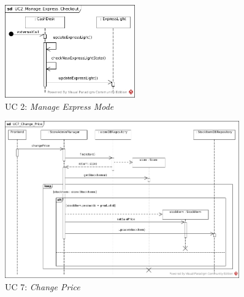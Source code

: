 			\begin{figure}[!h]
				\centering
				\includegraphics[width = 0.5\textwidth]{img/UC2_Manage_Express_Checkout.jpg}
				\caption{UC 2: \textit{Manage Express Mode}}
				\label{MS_UC2}
			\end{figure}
			
			\begin{figure}[!h]
				\centering
				\includegraphics[width = 0.9\textwidth]{img/UC7_Change_Price.jpg}
				\caption{UC 7: \textit{Change Price}}
				\label{MS_UC7}
			\end{figure}
			
